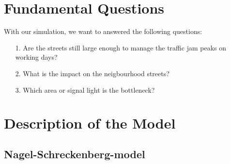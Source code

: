 \documentclass[11pt]{article}
\begin{document}
\section{Fundamental Questions}

With our simulation, we want to answered the following questions:
\begin{itemize}
\item[1.] Are the streets still large enough to manage the traffic jam peaks on working days?
\item[2.] What is the impact on the neigbourhood streets?
\item[3.] Which area or signal light is the bottleneck?
\end{itemize}
\section{Description of the Model}

\subsection{Nagel-Schreckenberg-model}
\end{document}
